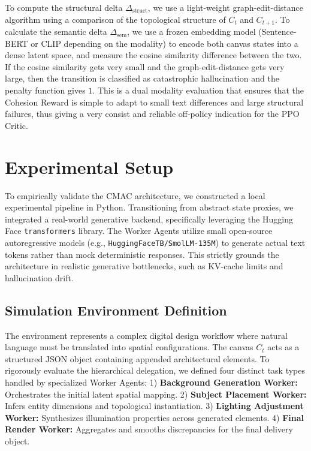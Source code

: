 \documentclass[pdflatex,sn-mathphys-num]{sn-jnl}
\begin{document}
To compute the structural delta $\Delta_{\mathrm{struct}}$, we use a light-weight graph-edit-distance algorithm using a comparison of the topological structure of $C_t$ and $C_{t+1}$. To calculate the semantic delta $\Delta_{\mathrm{sem}}$, we use a frozen embedding model (Sentence-BERT or CLIP depending on the modality) to encode both canvas states into a dense latent space, and measure the cosine similarity difference between the two. If the cosine similarity gets very small and the graph-edit-distance gets very large, then the transition is classified as catastrophic hallucination and the penalty function gives $1$. This is a dual modality evaluation that ensures that the Cohesion Reward is simple to adapt to small text differences and large structural failures, thus giving a very consist and reliable off-policy indication for the PPO Critic.

\section{Experimental Setup}
To empirically validate the CMAC architecture, we constructed a local experimental pipeline in Python. Transitioning from abstract state proxies, we integrated a real-world generative backend, specifically leveraging the Hugging Face \texttt{transformers} library. The Worker Agents utilize small open-source autoregressive models (e.g., \texttt{HuggingFaceTB/SmolLM-135M}) to generate actual text tokens rather than mock deterministic responses. This strictly grounds the architecture in realistic generative bottlenecks, such as KV-cache limits and hallucination drift.

\subsection{Simulation Environment Definition}
The environment represents a complex digital design workflow where natural language must be translated into spatial configurations. The canvas $C_t$ acts as a structured JSON object containing appended architectural elements. To rigorously evaluate the hierarchical delegation, we defined four distinct task types handled by specialized Worker Agents:
1) \textbf{Background Generation Worker:} Orchestrates the initial latent spatial mapping.
2) \textbf{Subject Placement Worker:} Infers entity dimensions and topological instantiation.
3) \textbf{Lighting Adjustment Worker:} Synthesizes illumination properties across generated elements.
4) \textbf{Final Render Worker:} Aggregates and smooths discrepancies for the final delivery object.
\end{document}
